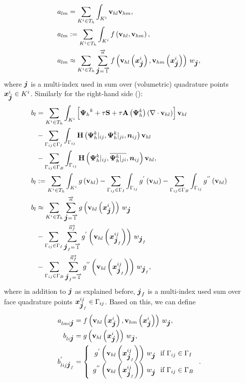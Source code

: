 \begin{align}
a_{lm} & =  \sum_{K^i \in T_h}\int_{K^i} \mathrm{\mathbf{v}}_{hl} \mathrm{\mathbf{v}}_{hm}, \\
a_{lm} & := \sum_{K^i \in T_h}\int_{K^i} f\left(\mathrm{\mathbf{v}}_{hl}, \mathrm{\mathbf{v}}_{hm}\right) , \\
a_{lm} & \approx \sum_{K^i \in T_h} \sum_{\mbox{\boldmath $j$}=\overrightarrow{1}}^{\overrightarrow{n}} f\left(\mathrm{\mathbf{v}}_{hl}\left(\mbox{\boldmath $x$}_{\mbox{\boldmath $j$}}^i\right), \mathrm{\mathbf{v}}_{hm}\left(\mbox{\boldmath $x$}_{\mbox{\boldmath $j$}}^i\right)\right)\,w_{\mbox{\boldmath $j$}},\label{Final_Integration_Fn}
\end{align}
where $\mbox{\boldmath $j$}$ is a multi-index used in sum over (volumetric) quadrature points $\mbox{\boldmath $x$}_{\mbox{\boldmath $j$}}^i \in K^i$.
Similarly for the right-hand side ():
\begin{align}
b_{l} & =  \sum_{K^i \in T_h}\int_{K^i} \left[{\mathrm{\mathbf{\Psi}}_h}^{k} + \tau\mathrm{\mathbf{S}} + \tau\mathrm{\mathbf{A}}\left({\mathrm{\mathbf{\Psi}}_h^{k}}\right) \left(\nabla \cdot \mathrm{\mathbf{v}}_{hl}\right)\right] \mathrm{\mathbf{v}}_{hl}\\
\nonumber & - \sum_{\Gamma_{ij}\in\Gamma_I} \int_{\Gamma_{ij}}\mathrm{\mathbf{H}}\left({\mathrm{\mathbf{\Psi}}_h^{k}}|_{ij}, {\mathrm{\mathbf{\Psi}}_h^{k}}|_{ji}, \mbox{\boldmath $n$}_{ij}\right) \mathrm{\mathbf{v}}_{hl}\\
\nonumber& - \sum_{\Gamma_{ij}\in\Gamma_B} \int_{\Gamma_{ij}} \mathrm{\mathbf{H}}\left({\mathrm{\mathbf{\Psi}}_h^{k}}|_{ij}, \overline{{\mathrm{\mathbf{\Psi}}_h^{k}}|_{ji}}, \mbox{\boldmath $n$}_{ij}\right) \mathrm{\mathbf{v}}_{hl},\\
\label{Final_Integration_Fn_b}   b_{l} & := \sum_{K^i \in T_h}\int_{K^i} g\left(\mathrm{\mathbf{v}}_{hl}\right) - \sum_{\Gamma_{ij}\in\Gamma_I} \int_{\Gamma_{ij}}g^{'}\left(\mathrm{\mathbf{v}}_{hl}\right) - \sum_{\Gamma_{ij}\in\Gamma_B} \int_{\Gamma_{ij}} g^{''}\left(\mathrm{\mathbf{v}}_{hl}\right) \\
b_{l} & \approx \sum_{K^i \in T_h} \sum_{\mbox{\boldmath $j$}=\overrightarrow{1}}^{\overrightarrow{n}} g\left(\mathrm{\mathbf{v}}_{hl}\left(\mbox{\boldmath $x$}_{\mbox{\boldmath $j$}}^i\right)\right)\,w_{\mbox{\boldmath $j$}}\\
\nonumber & -  \sum_{\Gamma_{ij}\in\Gamma_I} \sum_{\mbox{\boldmath $j$}_f=\overrightarrow{1}}^{\overrightarrow{n_f}} g^{'}\left(\mathrm{\mathbf{v}}_{hl}\left(\mbox{\boldmath $x$}^{ij}_{\mbox{\boldmath $j$}_{f}}\right)\right)\,w_{\mbox{\boldmath $j$}_{f}}\\
\nonumber & -  \sum_{\Gamma_{ij}\in\Gamma_B} \sum_{\mbox{\boldmath $j$}_{f}=\overrightarrow{1}}^{\overrightarrow{n_f}} g^{''}\left(\mathrm{\mathbf{v}}_{hl}\left(\mbox{\boldmath $x$}^{ij}_{\mbox{\boldmath $j$}_{f}}\right)\right)\,w_{\mbox{\boldmath $j$}_{f}},
\end{align}
where in addition to $\mbox{\boldmath $j$}$ as explained before, $\mbox{\boldmath $j$}_{f}$ is a multi-index used sum over face quadrature points $\mbox{\boldmath $x$}_{\mbox{\boldmath $j$}_f}^{ij} \in \Gamma_{ij}$. Based on this, we can define
\begin{align}
	\label{singleNumIntA}   a_{lmi \bfj} & =  f\lo\mrvhl\lo\bfx^i_{\bfj}\ro, \mrvhm\lo\bfx^i_{\bfj}\ro\ro\,w_{\bfj},\\
	\label{singleNumIntB}   b_{li \bfj} & =  g\lo\mrvhl\lo\bfx^i_{\bfj}\ro\ro\,w_{\bfj},\\
	\label{singleNumIntBface}  b^{'}_{lij \bfj_f} & =  \left\{\begin{array}{c} g^{'}\lo\mrvhl\lo\bfx^{ij}_{\bfj_f}\ro\ro\,w_{\bfj}\ \ \text{if}\ \Gamma_{ij}\in \Gamma_I \\ g^{''}\lo\mrvhl\lo\bfx^{ij}_{\bfj_f}\ro\ro\,w_{\bfj}\ \ \text{if}\ \Gamma_{ij}\in \Gamma_B \end{array}\right. .
\end{align}

